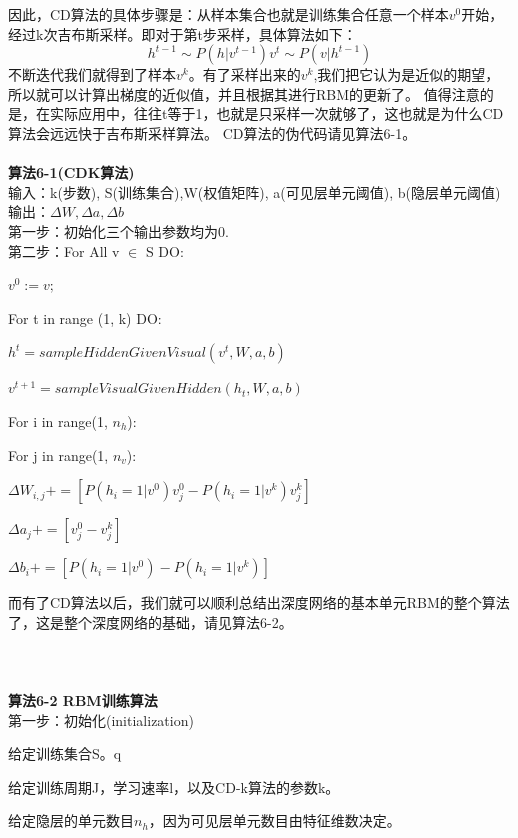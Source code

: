 	因此，CD算法的具体步骤是：从样本集合也就是训练集合任意一个样本$v^0$开始，经过k次吉布斯采样。即对于第t步采样，具体算法如下：
	\begin{equation}
	h^{t-1} \sim P(h|v^{t-1})
	v^t \sim P(v|h^{t-1})
	\end{equation}
	不断迭代我们就得到了样本$v^k$。有了采样出来的$v^k$,我们把它认为是近似的期望，所以就可以计算出梯度的近似值，并且根据其进行RBM的更新了。
	值得注意的是，在实际应用中，往往t等于1，也就是只采样一次就够了，这也就是为什么CD算法会远远快于吉布斯采样算法。
	CD算法的伪代码请见算法6-1。\\ \\
	\textbf{算法6-1(CDK算法)}\\
	输入：k(步数), S(训练集合),W(权值矩阵), a(可见层单元阈值), b(隐层单元阈值)\\
	输出：$\Delta W, \Delta a, \Delta b$\\
	第一步：初始化三个输出参数均为0.\\
	第二步：For All v $\in$ S DO:
	
		\qquad $v^0 := v;$
		
		\qquad For t in range (1, k) DO:
		
			\qquad \qquad $h^t= sampleHiddenGivenVisual (v^t, W, a, b)$
			
			\qquad \qquad $v^{t+1}= sampleVisualGivenHidden(h_t, W, a, b)$
			
		\qquad For i in range(1, $n_h$):
		
		\qquad \qquad For j in range(1, $n_v$):
		
		\qquad \qquad $\Delta W_{i, j} += [P(h_i = 1|v^0)v_j^0 - P(h_i = 1|v^k)v_j^k]$
		
		\qquad \qquad $\Delta a_j += [v_j^0 - v_j^k]$
		
		\qquad \qquad $\Delta b_i += [P(h_i = 1| v^0) - P(h_i = 1|v^k)]$
		
	而有了CD算法以后，我们就可以顺利总结出深度网络的基本单元RBM的整个算法了，这是整个深度网络的基础，请见算法6-2。\\ \\ \\ \\ 
	\textbf{算法6-2 RBM训练算法}\\
	第一步：初始化(initialization)
	
		\qquad 给定训练集合S。q
		
		\qquad 给定训练周期J，学习速率l，以及CD-k算法的参数k。
		
		\qquad 给定隐层的单元数目$n_h$，因为可见层单元数目由特征维数决定。
		

